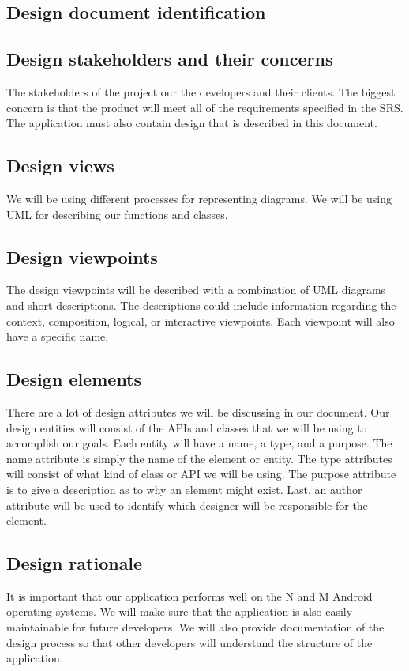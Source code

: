 \documentclass[journal,compsoc, 10pt, draftclsnofoot, onecolumn]{IEEEtran}
\begin{document}
\subsection{Design document identification}

\subsection{Design stakeholders and their concerns}
The stakeholders of the project our the developers and their clients. The 
biggest concern is that the product will meet all of the requirements specified 
in the SRS. The application must also contain design that is described in this 
document. 

\subsection{Design views}
We will be using different processes for representing diagrams. We will be using
 UML for describing our functions and classes.

\subsection{Design viewpoints}
The design viewpoints will be described with a combination of UML diagrams and 
short descriptions. The descriptions could include information regarding the 
context, composition, logical, or interactive viewpoints. Each viewpoint will 
also have a specific name.

\subsection{Design elements}
There are a lot of design attributes we will be discussing in our document. Our 
design entities will consist of the APIs and classes that we will be using to 
accomplish our goals. Each entity will have a name, a type, and a purpose. The 
name attribute is simply the name of the element or entity. The type attributes 
will consist of what kind of class or API we will be using. The purpose attribute 
is to give a description as to why an element might exist. Last, an author 
attribute will be used to identify which designer will be responsible for the 
element.

\subsection{Design rationale}
It is important that our application performs well on the N and M Android operating 
systems. We will make sure that the application is also easily maintainable 
for future developers. We will also provide documentation of the design process 
so that other developers will understand the structure of the application.
\end{document}
